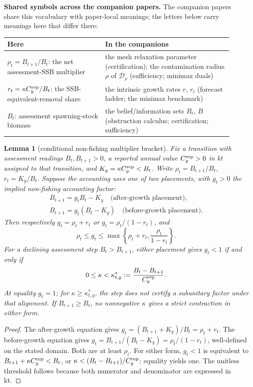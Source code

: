 \documentclass[10pt,twocolumn]{article}
\theoremstyle{plain}
\newtheorem{lemma}[theorem]{Lemma}
\theoremstyle{remark}
\begin{document}
\medskip
\noindent\textbf{Shared symbols across the companion papers.} The companion papers share this vocabulary with paper-local meanings; the letters below carry meanings here that differ there:
\begin{center}\small
\begin{tabular}{@{}p{0.40\linewidth}p{0.52\linewidth}@{}}
\toprule
\textbf{Here} & \textbf{In the companions} \\
\midrule
\(\rho_t=B_{t+1}/B_t\): the net assessment-SSB multiplier &
the mesh relaxation parameter (certification); the contamination radius
\(\rho\) of \(\mathcal{D}_{\rho}\) (sufficiency; minimax duals) \\
\(r_t=\kappa C_y^{\rm rep}/B_t\): the SSB-equivalent-removal share &
the intrinsic growth rates \(r\), \(r_i\) (forecast ladder; the
minimax benchmark) \\
\(B_t\): assessment spawning-stock biomass &
the belief/information sets \(B_t\), \(B\) (obstruction calculus;
certification; sufficiency) \\
\bottomrule
\end{tabular}
\end{center}

\begin{lemma}[conditional non-fishing multiplier bracket]\label{lem:bracket}
Fix a transition with assessment readings \(B_t,B_{t+1}>0\), a reported annual value \(C_y^{\rm rep}>0\) in kt assigned to that transition, and \(K_y=\kappa C_y^{\rm rep}<B_t\). Write \(\rho_t=B_{t+1}/B_t\), \(r_t=K_y/B_t\). Suppose the accounting uses one of two placements, with \(g_t>0\) the implied non-fishing accounting factor:
\[
\begin{gathered}
B_{t+1}=g_t B_t-K_y \quad\text{(after-growth placement)},\\
B_{t+1}=g_t(B_t-K_y) \quad\text{(before-growth placement)}.
\end{gathered}
\]
Then respectively \(g_t=\rho_t+r_t\) or \(g_t=\rho_t/(1-r_t)\), and
\[
\rho_t\le g_t\le\max\left\{\rho_t+r_t,\frac{\rho_t}{1-r_t}\right\}.
\]
For a declining assessment step \(B_t>B_{t+1}\), either placement gives \(g_t<1\) if and only if
\[
0\le\kappa<\kappa^*_{t,y}:=\frac{B_t-B_{t+1}}{C_y^{\rm rep}}.
\]
At equality \(g_t=1\); for \(\kappa\ge\kappa^*_{t,y}\), the step does not certify a subunitary factor under that alignment. If \(B_{t+1}\ge B_t\), no nonnegative \(\kappa\) gives a strict contraction in either form.
\end{lemma}

\begin{proof}
The after-growth equation gives \(g_t=(B_{t+1}+K_y)/B_t=\rho_t+r_t\). The before-growth equation gives \(g_t=B_{t+1}/(B_t-K_y)=\rho_t/(1-r_t)\), well-defined on the stated domain. Both are at least \(\rho_t\). For either form, \(g_t<1\) is equivalent to \(B_{t+1}+\kappa C_y^{\rm rep}<B_t\), or \(\kappa<(B_t-B_{t+1})/C_y^{\rm rep}\); equality yields one. The unitless threshold follows because both numerator and denominator are expressed in kt.
\end{proof}
\end{document}
